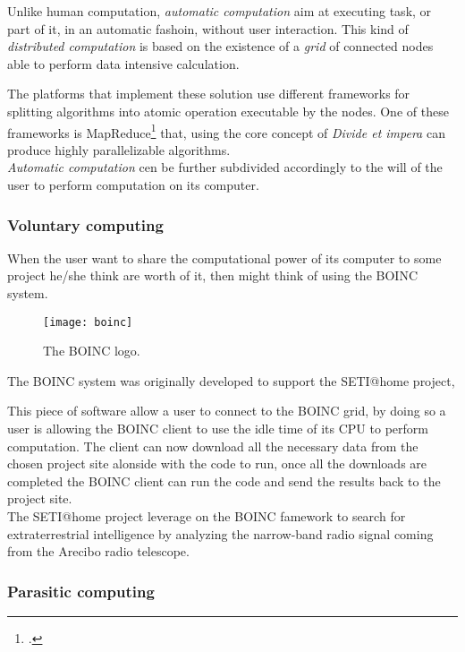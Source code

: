 Unlike human computation, \emph{automatic computation} aim at executing task, or
part of it, in an automatic fashoin, without user interaction. This kind of
\emph{distributed computation} is based on the existence of a \emph{grid} of
connected nodes able to perform data intensive calculation.

The platforms that implement these solution use different frameworks for splitting
algorithms into atomic operation executable by the nodes. One of these frameworks
is MapReduce\footcite{dean2008mapreduce} that, using the core concept of
\emph{Divide et impera} can produce highly parallelizable algorithms.\\

\emph{Automatic computation} cen be further subdivided accordingly to the will
of the user to perform computation on its computer.

\subsubsection{Voluntary computing}
\label{sec:bg:crowd:auto:voluntary}
When the user want to share the computational power of its computer to some
project he/she think are worth of it, then might think of using the \ac{BOINC}
system.\\

\begin{figure}[htb]
    \centering
    \texttt{[image: boinc]}
    \caption{The \acs{BOINC} logo.}
    \label{fig:boinc}
\end{figure}
The \ac{BOINC} system was originally developed to support the \ac{SETI@home}
project, 

This piece of software allow a user to connect to the \ac{BOINC} grid, by doing
so a user is allowing the \ac{BOINC} client to use the idle time of its CPU to
perform computation. The client can now  download all the necessary data from the
chosen project site alonside with the code to run, once all the downloads are
completed the \ac{BOINC} client can run the code and send the results back to
the project site.\\

The \ac{SETI@home} project leverage on the \ac{BOINC} famework to search for
extraterrestrial intelligence by analyzing the narrow-band radio signal coming
from the Arecibo radio telescope.


\subsubsection{Parasitic computing}
\label{sec:bg:crowd:auto:parasitic}
